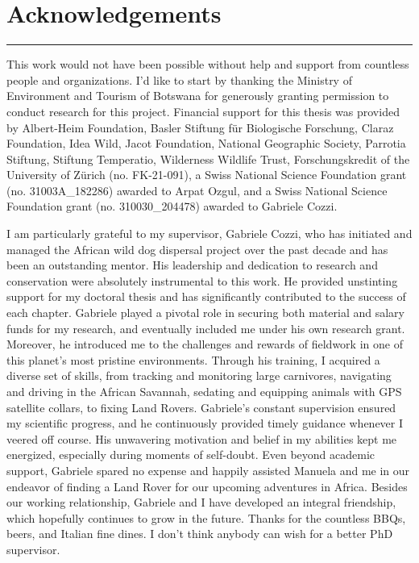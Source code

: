 \documentclass[../FinalThesis.tex]{subfiles}
\begin{document}
\chapter*{Acknowledgements}
\thispagestyle{empty}
\vspace{-1cm}
\noindent\hfil\rule{0.75\textwidth}{.4pt}\hfil

\newpage

This work would not have been possible without help and support from countless
people and organizations. I'd like to start by thanking the Ministry of
Environment and Tourism of Botswana for generously granting permission to
conduct research for this project. Financial support for this thesis was
provided by Albert-Heim Foundation, Basler Stiftung für Biologische Forschung,
Claraz Foundation, Idea Wild, Jacot Foundation, National Geographic Society,
Parrotia Stiftung, Stiftung Temperatio, Wilderness Wildlife Trust,
Forschungskredit of the University of Zürich (no. FK-21-091), a Swiss National
Science Foundation grant (no. 31003A\_182286) awarded to Arpat Ozgul, and a
Swiss National Science Foundation grant (no. 310030\_204478) awarded to Gabriele
Cozzi.

I am particularly grateful to my supervisor, Gabriele Cozzi, who has initiated
and managed the African wild dog dispersal project over the past decade and has
been an outstanding mentor. His leadership and dedication to research and
conservation were absolutely instrumental to this work. He provided unstinting
support for my doctoral thesis and has significantly contributed to the success
of each chapter. Gabriele played a pivotal role in securing both material and
salary funds for my research, and eventually included me under his own research
grant. Moreover, he introduced me to the challenges and rewards of fieldwork in
one of this planet's most pristine environments. Through his training, I
acquired a diverse set of skills, from tracking and monitoring large carnivores,
navigating and driving in the African Savannah, sedating and equipping animals
with GPS satellite collars, to fixing Land Rovers. Gabriele's constant
supervision ensured my scientific progress, and he continuously provided timely
guidance whenever I veered off course. His unwavering motivation and belief in
my abilities kept me energized, especially during moments of self-doubt. Even
beyond academic support, Gabriele spared no expense and happily assisted Manuela
and me in our endeavor of finding a Land Rover for our upcoming adventures in
Africa. Besides our working relationship, Gabriele and I have developed an integral
friendship, which hopefully continues to grow in the future. Thanks for the
countless BBQs, beers, and Italian fine dines. I don't think anybody can wish
for a better PhD supervisor.
\end{document}
